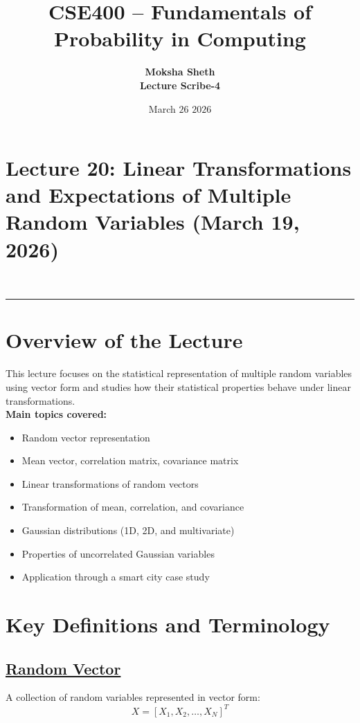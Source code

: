 \documentclass[11pt]{article}
\title{\textbf{CSE400 – Fundamentals of Probability in Computing}}
\author{\textbf{Moksha Sheth} \\\textbf{Lecture Scribe-4}}
\date{March $26$ $2026$}
\begin{document}
\maketitle

\section*{Lecture 20: Linear Transformations and Expectations
of Multiple Random Variables (March 19, 2026)}\\

\hrule
\vspace{1.5cm}

\section{Overview of the Lecture}

This lecture focuses on the statistical representation of multiple random variables using vector form and studies how their statistical properties behave under linear transformations.\\

\textbf{Main topics covered:}
\begin{itemize}
    \item Random vector representation
    \item Mean vector, correlation matrix, covariance matrix
    \item Linear transformations of random vectors
    \item Transformation of mean, correlation, and covariance
    \item Gaussian distributions (1D, 2D, and multivariate)
    \item Properties of uncorrelated Gaussian variables
    \item Application through a smart city case study
\end{itemize}

\vspace{1cm}
\section{Key Definitions and Terminology}

\vspace{0.5cm}
\subsection*{\underline{Random Vector}}
A collection of random variables represented in vector form:
\[
X = [X_1, X_2, \dots, X_N]^T
\]
\end{document}
